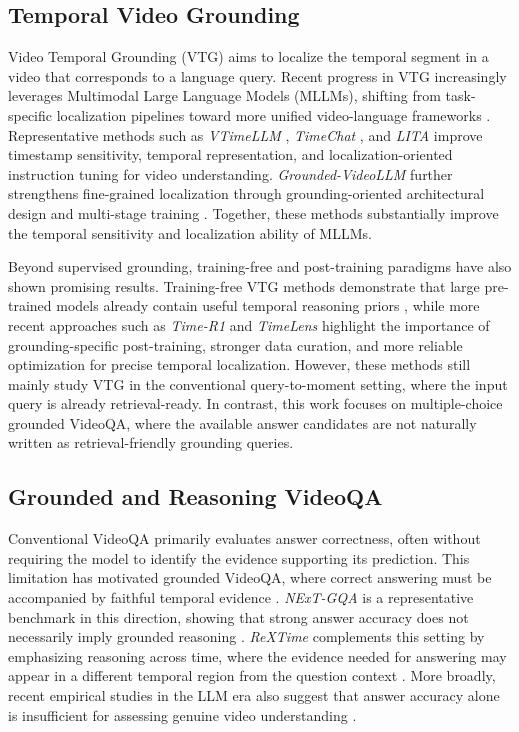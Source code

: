 \subsection{Temporal Video Grounding}

Video Temporal Grounding (VTG) aims to localize the temporal segment in a video that corresponds to a language query. Recent progress in VTG increasingly leverages Multimodal Large Language Models (MLLMs), shifting from task-specific localization pipelines toward more unified video-language frameworks \cite{wu2025survey_vtg_mllm}. Representative methods such as \emph{VTimeLLM} \cite{huang2024vtimellm}, \emph{TimeChat} \cite{ren2024timechat}, and \emph{LITA} \cite{huang2024lita} improve timestamp sensitivity, temporal representation, and localization-oriented instruction tuning for video understanding. \emph{Grounded-VideoLLM} further strengthens fine-grained localization through grounding-oriented architectural design and multi-stage training \cite{wang2025grounded_videollm}. Together, these methods substantially improve the temporal sensitivity and localization ability of MLLMs.

Beyond supervised grounding, training-free and post-training paradigms have also shown promising results. Training-free VTG methods demonstrate that large pre-trained models already contain useful temporal reasoning priors \cite{zheng2024training, xu2025zero, qu2024chatvtg}, while more recent approaches such as \emph{Time-R1} \cite{wang2025timer1} and \emph{TimeLens} \cite{zhang2026timelens} highlight the importance of grounding-specific post-training, stronger data curation, and more reliable optimization for precise temporal localization. However, these methods still mainly study VTG in the conventional query-to-moment setting, where the input query is already retrieval-ready. In contrast, this work focuses on multiple-choice grounded VideoQA, where the available answer candidates are not naturally written as retrieval-friendly grounding queries.

\subsection{Grounded and Reasoning VideoQA}

Conventional VideoQA primarily evaluates answer correctness, often without requiring the model to identify the evidence supporting its prediction. This limitation has motivated grounded VideoQA, where correct answering must be accompanied by faithful temporal evidence \cite{xiao2024can}. \emph{NExT-GQA} is a representative benchmark in this direction, showing that strong answer accuracy does not necessarily imply grounded reasoning \cite{xiao2024can}. \emph{ReXTime} complements this setting by emphasizing reasoning across time, where the evidence needed for answering may appear in a different temporal region from the question context \cite{chen2024rextime}. More broadly, recent empirical studies in the LLM era also suggest that answer accuracy alone is insufficient for assessing genuine video understanding \cite{xiao2025videoqa}.

